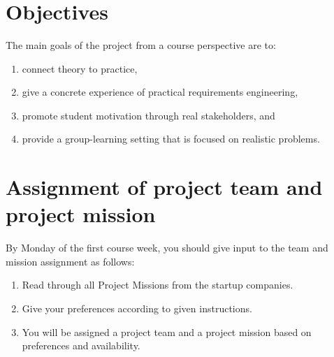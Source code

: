 \documentclass[10pt,a4paper]{article}
\title{\bf\sffamily\fontsize{18}{18}\selectfont{
Project Description\\ ETSN15 Requirements Engineering\\http://cs.lth.se/krav
}}
\author{\bf\sffamily\fontsize{12}{12}\selectfont{Björn Regnell, Elizabeth Bjarnason, Johan Linåker}}
\date{\bf\sffamily\fontsize{10}{10}\selectfont{Study period: 2021-VT1, Revision date: \today}}
\begin{document}
\maketitle
\vspace{-1cm}

\section{Objectives}
The main goals of the project from a course perspective are to:
\begin{enumerate}[noitemsep]
\item connect theory to practice,
\item give a concrete experience of practical requirements engineering,
\item promote student motivation through real stakeholders, and
\item provide a group-learning setting that is focused on realistic problems.
\end{enumerate}

\section{Assignment of project team and project mission}
By Monday of the first course week, you should give input to the team and mission assignment as follows: 
\begin{enumerate}[noitemsep]
  \item Read through all Project Missions from the startup companies.
  \item Give your preferences according to given instructions.
  \item You will be assigned a project team and a project mission based on preferences and availability.
\end{enumerate}
\end{document}
